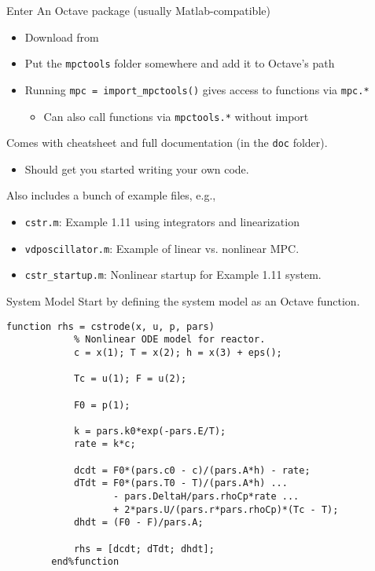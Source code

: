 \documentclass[xcolor=dvipsnames,handout]{beamer}
\begin{document}
\begin{frame}{Enter \mpctools}
    An Octave package (usually Matlab-compatible)
    \begin{itemize}
        \item Download from \bitbucketlink
        \item Put the \texttt{mpctools} folder somewhere and add it to Octave's path
        \item Running \lstinline!mpc = import_mpctools()! gives access to functions via \lstinline!mpc.*!
        \begin{itemize}
            \item Can also call functions via \lstinline!mpctools.*! without import
        \end{itemize}
    \end{itemize} \pause
    
    \medskip
    
    Comes with cheatsheet and full documentation (in the \texttt{doc} folder).
    \begin{itemize}
        \item Should get you started writing your own code.
    \end{itemize} \pause
    
    \medskip
    
    Also includes a bunch of example files, e.g.,
    \begin{itemize}
        \item \texttt{cstr.m}: Example 1.11 using \casadi{} integrators and linearization
        \item \texttt{vdposcillator.m}: Example of linear vs. nonlinear MPC.
        \item \texttt{cstr\_startup.m}: Nonlinear startup for Example 1.11 system.
    \end{itemize}
\end{frame}

\begin{frame}[fragile]{System Model}
    Start by defining the system model as an Octave function.
    
    \begin{lstlisting}[gobble=8]
        function rhs = cstrode(x, u, p, pars)
            % Nonlinear ODE model for reactor.
            c = x(1); T = x(2); h = x(3) + eps();
            
            Tc = u(1); F = u(2);
            
            F0 = p(1);
            
            k = pars.k0*exp(-pars.E/T);
            rate = k*c;
            
            dcdt = F0*(pars.c0 - c)/(pars.A*h) - rate;
            dTdt = F0*(pars.T0 - T)/(pars.A*h) ...
                   - pars.DeltaH/pars.rhoCp*rate ...
                   + 2*pars.U/(pars.r*pars.rhoCp)*(Tc - T); 
            dhdt = (F0 - F)/pars.A;
            
            rhs = [dcdt; dTdt; dhdt];
        end%function
    \end{lstlisting}
\end{frame}
\end{document}
